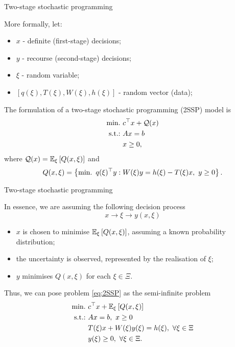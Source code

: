 \begin{frame}{Two-stage stochastic programming}

	More formally, let:
	\vspace{-6pt}
	\begin{itemize}
		\item $x$ - definite (first-stage) decisions; 
		\item $y$ - recourse (second-stage) decisions;
		\item $\xi$ - \alert{random} variable;
		\item $[q(\xi), T(\xi), W(\xi), h(\xi)]$ - random vector (data);  	
	\end{itemize}
	
	\pause
	The formulation of a \alert{two-stage stochastic programming (2SSP)} model is
	\begin{subequations} \label{eq:2SSP}
		\begin{align}
			\mathop{\text{min.} \ } & c^\top x + \mathcal{Q}(x) \\
			\mathop{\text{s.t.:} \ }  & Ax = b \\
			     & x \ge 0, 
		\end{align}
	\end{subequations}
	where $\mathcal{Q}(x) = \mathbb{E}_\xi\left[ Q(x, \xi) \right]$ and
	\begin{equation} \label{eq:2stage}
		Q(x, \xi) = \left\{ \mathop{\text{min.} \ } q(\xi)^\top y : W(\xi)y = h(\xi) - T(\xi)x, \ y \ge 0 \right \}.
	\end{equation}

\end{frame}


\begin{frame}{Two-stage stochastic programming}

	In essence, we are assuming the following \alert{decision process}
	$$
	 x \rightarrow \xi \rightarrow y(x, \xi)
	$$	
	\vspace{-12pt}
	\begin{itemize}
		\item $x$ is chosen to minimise $\mathbb{E}_\xi\left[ Q(x, \xi) \right]$, assuming a \alert{known} probability distribution;
		\item the uncertainty is \alert{observed}, represented by the realisation of $\xi$;
		\item $y$ minimises $Q(x, \xi)$ for each $\xi \in \Xi$.	
	\end{itemize}
	\pause
	Thus, we can pose problem \eqref{eq:2SSP} as the \alert{semi-infinite} problem
	\begin{subequations} \label{eq:2SSP_2}
	\begin{align}
		\mathop{\text{min.} \ }  & c^\top x + \mathbb{E}_\xi\left[ Q(x, \xi) \right] \\
		\mathop{\text{s.t.:} \ }	   & Ax = b, \ x \ge 0 \\
			   & T(\xi)x + W(\xi)y(\xi) = h(\xi), \ \forall \xi \in \Xi \\
			   & y(\xi) \ge 0, \ \forall \xi \in \Xi.
	\end{align}
	\end{subequations}

\end{frame}


